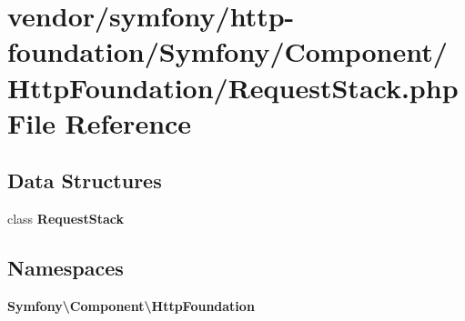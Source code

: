 \section{vendor/symfony/http-\/foundation/\+Symfony/\+Component/\+Http\+Foundation/\+Request\+Stack.php File Reference}
\label{_request_stack_8php}
\subsection*{Data Structures}
\begin{DoxyCompactItemize}
\item 
class {\bf Request\+Stack}
\end{DoxyCompactItemize}
\subsection*{Namespaces}
\begin{DoxyCompactItemize}
\item 
 {\bf Symfony\textbackslash{}\+Component\textbackslash{}\+Http\+Foundation}
\end{DoxyCompactItemize}
